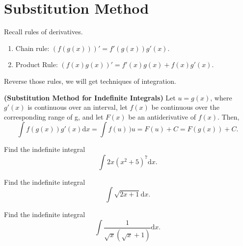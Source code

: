 
\hypertarget{substitution-method}{%
\section{Substitution Method}\label{substitution-method}}

Recall rules of derivatives.

\begin{enumerate}[sepno]
\item
  Chain rule: \((f(g(x)))'=f'(g(x))g'(x)\).
\item
  Product Rule: \((f(x)g(x))'=f'(x)g(x)+f(x)g'(x)\).
\end{enumerate}

Reverse those rules, we will get techniques of integration.

\begin{theorem}

\textbf{(Substitution Method for Indefinite Integrals)} Let \(u=g(x)\),
where \(g'(x)\) is continuous over an interval, let \(f(x)\) be
continuous over the corresponding range of g, and let \(F(x)\) be an
antiderivative of \(f(x).\) Then,
\[\int f(g(x))g'(x)\mathrm{d} x =\int f(u)\,)u=F(u)+C= F(g(x))+C.\]

\end{theorem}

\begin{example}

Find the indefinite integral \[\int 2x(x^2+5)^7\mathrm{d} x.\]

\end{example}
\vspace*{6\baselineskip}

\begin{example}

Find the indefinite integral \[\int \sqrt{2x+1}\mathrm{d} x.\]

\end{example}
\vspace*{6\baselineskip}




\begin{example}

Find the indefinite integral
\[\int \dfrac{1}{\sqrt{x}(\sqrt{x}+1)}\mathrm{d} x.\]

\end{example}
\vspace*{6\baselineskip}

